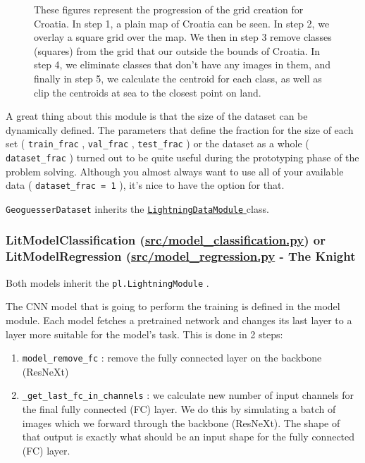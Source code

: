 \documentclass[]{article}
\providecommand{\tightlist}{%
  \setlength{\itemsep}{0pt}\setlength{\parskip}{0pt}}
\let\oldtexttt\texttt
\renewcommand{\texttt}[1]{
  \textcolor{tcolor}{\colorbox{bgcolor}{\oldtexttt{#1}}}
}
\begin{document}
\begin{figure}[!h]
\caption{These figures represent the progression of the grid creation for Croatia. In step 1, a plain map of Croatia can be seen. In step 2, we overlay a square grid over the map. We then in step 3 remove classes (squares) from the grid that our outside the bounds of Croatia. In step 4, we eliminate classes that don’t have any images in them, and finally in step 5, we calculate the centroid for each class, as well as clip the centroids at sea to the closest point on land.}
\end{figure}

A great thing about this module is that the size of the dataset can be
dynamically defined. The parameters that define the fraction for the
size of each set
(\texttt{train\_frac},\texttt{val\_frac},\texttt{test\_frac}) or the
dataset as a whole (\texttt{dataset\_frac}) turned out to be quite
useful during the prototyping phase of the problem solving. Although you
almost always want to use all of your available data
(\texttt{dataset\_frac\ =\ 1}), it's nice to have the option for that.

\texttt{GeoguesserDataset} inherits the
\href{https://pytorch-lightning.readthedocs.io/en/stable/extensions/datamodules.htm}{\texttt{LightningDataModule}}
class.

\hypertarget{litmodelclassification-srcmodel_classification.py-or-litmodelregression-srcmodel_regression.py---the-knight}{%
\subsubsection{\texorpdfstring{LitModelClassification
(\url{src/model_classification.py}) or LitModelRegression
(\url{src/model_regression.py} - The
Knight}{LitModelClassification (src/model\_classification.py) or LitModelRegression (src/model\_regression.py - The Knight}}\label{litmodelclassification-srcmodel_classification.py-or-litmodelregression-srcmodel_regression.py---the-knight}}

Both models inherit the \texttt{pl.LightningModule}.

The CNN model that is going to perform the training is defined in the
model module. Each model fetches a pretrained network and changes its
last layer to a layer more suitable for the model's task. This is done
in 2 steps:

\begin{enumerate}
\def\labelenumi{\arabic{enumi}.}
\tightlist
\item
  \texttt{model\_remove\_fc}: remove the fully connected layer on the
  backbone (ResNeXt)
\item
  \texttt{\_get\_last\_fc\_in\_channels}: we calculate new number of
  input channels for the final fully connected (FC) layer. We do this by
  simulating a batch of images which we forward through the backbone
  (ResNeXt). The shape of that output is exactly what should be an input
  shape for the fully connected (FC) layer.
\end{enumerate}
\end{document}

